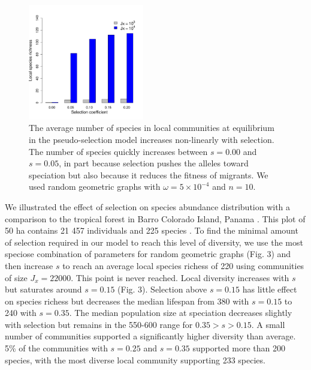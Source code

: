 \documentclass[letterpaper,twocolumn,superscriptaddress,showkeys]{revtex4}
\begin{document}
\begin{figure}[ht!]
	\centering \includegraphics[width=0.45\textwidth]{fig-ps.pdf}
	\caption{
The average number of species in local communities at equilibrium in the pseudo-selection model increases non-linearly with selection. The number of species quickly increases between $s = 0.00$ and $s = 0.05$, in part because selection pushes the alleles toward speciation but also because it reduces the fitness of migrants. We used random geometric graphs with $\omega = 5\times 10^{-4}$ and $n = 10$.
}
\end{figure}

We illustrated the effect of selection on species abundance distribution with a comparison to the tropical forest in Barro Colorado Island, Panama \cite{con02}. This plot of 50 ha contains 21 457 individuals and 225 species \cite{con02}. To find the minimal amount of selection required in our model to reach this level of diversity, we use the most speciose combination of parameters for random geometric graphs (Fig. 3) and then increase $s$ to reach an average local species richess of 220 using communities of size $J_x = 22 000$. This point is never reached. Local diversity increases with $s$ but saturates around $s = 0.15$ (Fig. 3). Selection above $s = 0.15$ has little effect on species richess but decreases the median lifespan from 380 with $s = 0.15$ to 240 with $s = 0.35$. The median population size at speciation decreases slightly with selection but remains in the 550-600 range for $0.35 > s > 0.15$. A small number of communities supported a significantly higher diversity than average. 5\% of the communities with $s = 0.25$ and $s = 0.35$ supported more than 200 species, with the most diverse local community supporting 233 species.
\end{document}
